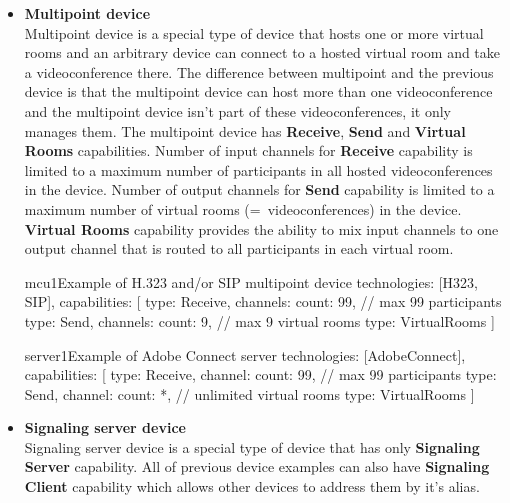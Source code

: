 \begin{itemize}
\begin{TopologyExample}{terminal4}%
      {Example of terminal with one virtual room for H.323 and/or SIP}
technologies: [H323, SIP],
capabilities: [
  {type: Receive, channels: {count: 9}}, // max 9 other participants
  {type: Send, channels: {count: 1}},
  {type: Mix}
]
\end{TopologyExample}

\item \textbf{Multipoint device} \\
  Multipoint device is a special type of device that hosts one or more virtual 
  rooms and an arbitrary device can connect to a hosted virtual room and take 
  a videoconference there. The difference between multipoint and the previous 
  device is that the multipoint device can host more than one videoconference 
  and the multipoint device isn't part of these videoconferences, it only 
  manages them. The multipoint device has \textbf{Receive}, \textbf{Send}
  and \textbf{Virtual Rooms} capabilities. Number of input 
  channels for \textbf{Receive} capability is limited to a maximum number of 
  participants in all hosted videoconferences in the device. Number of output 
  channels for \textbf{Send} capability is limited to a maximum number of 
  virtual rooms (=~videoconferences) in the device. \textbf{Virtual Rooms} 
  capability provides the ability to mix input channels to one output channel 
  that is routed to all participants in each virtual room.

\begin{TopologyExample}{mcu1}{Example of H.323 and/or SIP multipoint device}
technologies: [H323, SIP],
capabilities: [
  {type: Receive, channels: {count: 99}}, // max 99 participants
  {type: Send, channels: {count: 9}},     // max 9 virtual rooms
  {type: VirtualRooms}
]
\end{TopologyExample}

\begin{TopologyExample}{server1}{Example of Adobe Connect server}
technologies: [AdobeConnect],
capabilities: [
  {type: Receive, channel: {count: 99}}, // max 99 participants
  {type: Send, channel: {count: *}},     // unlimited virtual rooms
  {type: VirtualRooms}
]
\end{TopologyExample}

\item \textbf{Signaling server device} \\
  Signaling server device is a special type of device that has only 
  \textbf{Signaling Server} capability. All of previous device examples can 
  also have \textbf{Signaling Client} capability which allows other devices
  to address them by it's alias.
    

\end{itemize}
